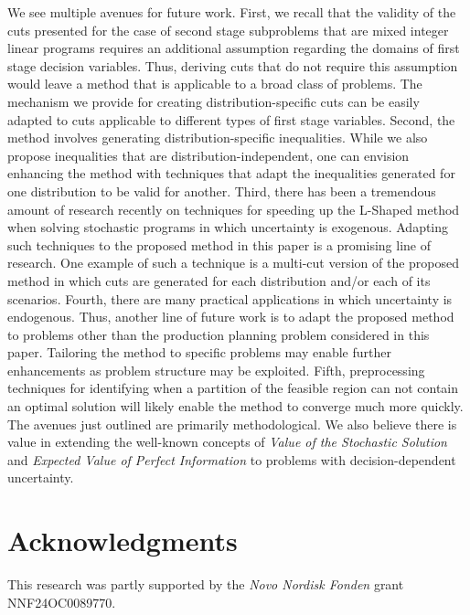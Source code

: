 \documentclass[12pt]{article}
\theoremstyle{thmstylethree}%
\begin{document}
We see multiple avenues for future work. First, we recall that the validity of the cuts presented for the case of second stage subproblems that are mixed integer linear programs requires an additional assumption regarding the domains of first stage decision variables. Thus, deriving cuts that do not require this assumption would leave a method that is applicable to a broad class of problems. The mechanism we provide for creating distribution-specific cuts can be easily adapted to cuts applicable to different types of first stage variables. Second, the method involves generating distribution-specific inequalities. While we also propose inequalities that are distribution-independent, one can envision enhancing the method with techniques that adapt the inequalities generated for one distribution to be valid for another.  Third, there has been a tremendous amount of research recently on techniques for speeding up the L-Shaped method when solving stochastic programs in which uncertainty is exogenous. Adapting such techniques to the proposed method in this paper is a promising line of research. One example of such a technique is a multi-cut version of the proposed method in which cuts are generated for each distribution and/or each of its scenarios.  Fourth, there are many practical applications in which uncertainty is endogenous. Thus, another line of future work is to adapt the proposed method to problems other than the production planning problem considered in this paper.  Tailoring the method to specific problems may enable further enhancements as problem structure may be exploited. Fifth, preprocessing techniques for identifying when a partition of the feasible region can not contain an optimal solution will likely enable the method to converge much more quickly. The avenues just outlined are primarily methodological. We also believe there is value in extending the well-known concepts of \textit{Value of the Stochastic Solution} and \textit{Expected Value of Perfect Information} to problems with decision-dependent uncertainty.   




\section{Acknowledgments}
This research was partly supported by the \textit{Novo Nordisk Fonden} grant NNF24OC0089770.
\end{document}
